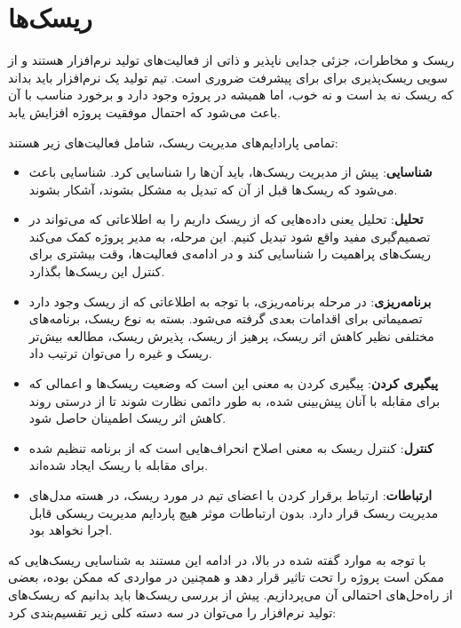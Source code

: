 
\chapter{ریسک‌ها}

ریسک و مخاطرات، جزئی جدایی ناپذیر و ذاتی از فعالیت‌های تولید نرم‌افزار هستند و از سویی ریسک‌پذیری برای برای پیشرفت ضروری است. تیم تولید یک نرم‌افزار باید بداند که ریسک نه بد است و نه خوب، اما همیشه در پروژه وجود دارد و برخورد مناسب با آن باعث می‌شود که احتمال موفقیت پروژه افزایش یابد.


تمامی پارادایم‌های مدیریت ریسک، شامل فعالیت‌های زیر هستند:

\begin{itemize}
	\item
	 \textbf{شناسایی}:
 پیش از مدیریت ریسک‌ها، باید آن‌ها را شناسایی کرد. شناسایی باعث می‌شود که ریسک‌ها قبل از آن‌ که تبدیل به مشکل بشوند، آشکار بشوند. 
	 
	 \item
	 \textbf{تحلیل}:
 تحلیل یعنی داده‌هایی که از ریسک داریم را به اطلاعاتی که می‌تواند در تصمیم‌گیری مفید واقع شود تبدیل کنیم. این مرحله، به مدیر پروژه کمک می‌کند ریسک‌های پراهمیت را شناسایی کند و در ادامه‌ی فعالیت‌ها، وقت بیشتری برای کنترل این ریسک‌ها بگذارد.
	 
	 \item 
	 \textbf{برنامه‌ریزی}:
 در مرحله برنامه‌ریزی، با توجه به اطلاعاتی که از ریسک وجود دارد تصمیماتی برای اقدامات بعدی گرفته می‌شود. بسته به نوع ریسک، برنامه‌های مختلفی نظیر کاهش اثر ریسک، پرهیز از ریسک، پذیرش ریسک، مطالعه بیش‌تر ریسک و غیره را می‌توان ترتیب داد.
	 
	 \item
	\textbf{پیگیری کردن}:
پیگیری کردن به معنی این است که وضعیت ریسک‌ها و اعمالی که برای مقابله با آنان پیش‌بینی شده، به طور دائمی نظارت شوند تا از درستی روند کاهش اثر ریسک اطمینان حاصل شود.
	 
	 \item 
	\textbf{کنترل}:
 کنترل ریسک به معنی اصلاح انحراف‌هایی است که از برنامه تنظیم شده برای مقابله با ریسک ایجاد شده‌اند.
	 
	 \item
	\textbf{ارتباطات}:
 ارتباط برقرار کردن با اعضای تیم در مورد ریسک، در هسته مدل‌های مدیریت ریسک قرار دارد. بدون ارتباطات موثر هیچ پاردایم مدیریت ریسکی قابل اجرا نخواهد بود.
	 
\end{itemize}


با توجه به موارد گفته شده در بالا، در ادامه این مستند به شناسایی ریسک‌هایی که ممکن است پروژه را تحت تاثیر قرار دهد و همچنین در مواردی که ممکن بوده، بعضی از راه‌حل‌های احتمالی آن می‌پردازیم. پیش از بررسی ریسک‌ها باید بدانیم که ریسک‌های تولید نرم‌افزار را می‌توان در سه دسته کلی زیر تقسیم‌بندی کرد:

